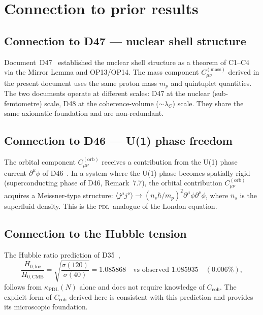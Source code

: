 \documentclass[12pt,a4paper]{article}
\newcommand{\hb}{\hbar}
\newcommand{\PDL}{\textsc{pdl}}
\newcommand{\Ccoh}{C_{\mathrm{coh}}}
\newcommand{\Cmass}{C^{(\mathrm{mass})}}
\newcommand{\Corb}{C^{(\mathrm{orb})}}
\newcommand{\sig}{\sigma}
\newcommand{\kPDL}{\kappa_{\mathrm{PDL}}}
\newcommand{\lambdaC}{\lambda_C}
\begin{document}
\section{Connection to prior results}
\label{sec:connection}

\subsection{Connection to D47 --- nuclear shell structure}

Document~D47~\cite{PDL_D47_2026} established the nuclear shell structure as a theorem of C1--C4 via the Mirror Lemma and OP13/OP14. The mass component $\Cmass_{\mu\nu}$ derived in the present document uses the same proton mass $m_p$ and quintuplet quantities. The two documents operate at different scales: D47 at the nuclear (sub-femtometre) scale, D48 at the coherence-volume ($\sim\lambdaC$) scale. They share the same axiomatic foundation and are non-redundant.

\subsection{Connection to D46 --- U(1) phase freedom}

The orbital component $\Corb_{\mu\nu}$ receives a contribution from the U(1) phase current $\partial^\mu\phi$ of D46~\cite{PDL_D46_2026}. In a system where the U(1) phase becomes spatially rigid (superconducting phase of D46, Remark~7.7), the orbital contribution $\Corb_{\mu\nu}$ acquires a Meissner-type structure: $\langle j^\mu j^\nu\rangle \to (n_s\hb/m_p)^2\partial^\mu\phi\partial^\nu\phi$, where $n_s$ is the superfluid density. This is the \PDL\ analogue of the London equation.

\subsection{Connection to the Hubble tension}

The Hubble ratio prediction of D35~\cite{PDL_D35_2026},
\begin{equation}
\frac{H_{0,\mathrm{loc}}}{H_{0,\mathrm{CMB}}} = \sqrt{\frac{\sig(120)}{\sig(40)}} = 1.085868 \quad\text{vs observed }1.085935\quad (0.006\%),
\end{equation}
follows from $\kPDL(N)$ alone and does not require knowledge of $\Ccoh$. The explicit form of $\Ccoh$ derived here is consistent with this prediction and provides its microscopic foundation.
\end{document}
